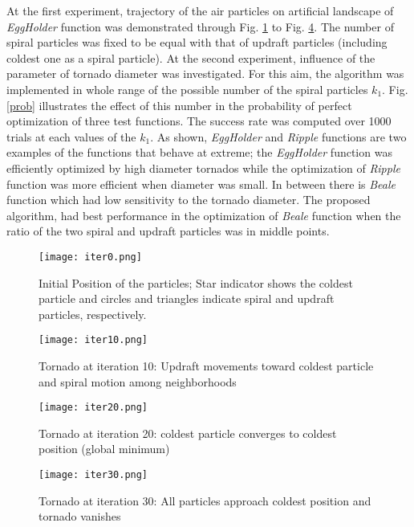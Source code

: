 \documentclass[conference]{IEEEtran}
\begin{document}
At the first experiment, trajectory of the air particles on artificial landscape of \emph{EggHolder} function was demonstrated through Fig. \ref{traj1} to Fig. \ref{traj4}. The number of spiral particles was fixed to be equal with that of updraft particles (including coldest one as a spiral particle). At the second experiment, influence of the parameter of tornado diameter was investigated. For this aim, the algorithm was implemented in whole range of the possible number of the spiral particles $k_1$. Fig. \ref{prob} illustrates the effect of this number in the probability of perfect optimization of three test functions. The success rate was computed over 1000 trials at each values of the $k_1$. As shown, \emph{EggHolder} and \emph{Ripple} functions are two examples of the functions that behave at extreme; the \emph{EggHolder} function was efficiently optimized by high diameter tornados while the optimization of \emph{Ripple} function was more efficient when diameter was small. In between there is \emph{Beale} function which had low sensitivity to the tornado diameter. The proposed algorithm, had best performance in the optimization of \emph{Beale} function when the ratio of the two spiral and updraft particles was in middle points.

\begin{figure}[h!]
 \centering
  \texttt{[image: iter0.png]}
  \caption{Initial Position of the particles; Star indicator shows the coldest particle and circles and triangles indicate spiral and updraft particles, respectively.}
  \label{traj1}
\end{figure}

\begin{figure}[h!]
 \centering
  \texttt{[image: iter10.png]}
  \caption{Tornado at iteration 10: Updraft movements toward coldest particle and spiral motion among neighborhoods}
  \label{traj2}
\end{figure}

\begin{figure}[h!]
 \centering
  \texttt{[image: iter20.png]}
  \caption{Tornado at iteration 20: coldest particle converges to coldest position (global minimum)}
  \label{traj3}
\end{figure}

\begin{figure}[h!]
 \centering
  \texttt{[image: iter30.png]}
  \caption{Tornado at iteration 30: All particles approach coldest position and tornado vanishes}
  \label{traj4}
\end{figure}
\end{document}
